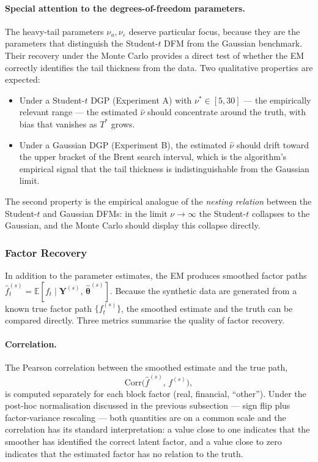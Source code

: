 \documentclass[11pt, a4paper, oneside]{article}
\begin{document}
\paragraph{Special attention to the degrees-of-freedom parameters.}
The heavy-tail parameters $\nu_u, \nu_\varepsilon$ deserve
particular focus, because they are the parameters that distinguish
the Student-$t$ DFM from the Gaussian benchmark. Their recovery
under the Monte Carlo provides a direct test of whether the EM
correctly identifies the tail thickness from the data. Two
qualitative properties are expected:
\begin{itemize}[leftmargin=1.5em, itemsep=3pt]
    \item Under a Student-$t$ DGP (Experiment A) with
          $\nu^* \in [5, 30]$ — the empirically relevant range —
          the estimated $\hat{\nu}$ should concentrate around the
          truth, with bias that vanishes as $T^*$ grows.
    \item Under a Gaussian DGP (Experiment B), the estimated
          $\hat{\nu}$ should drift toward the upper bracket of the
          Brent search interval, which is the algorithm's
          empirical signal that the tail thickness is
          indistinguishable from the Gaussian limit.
\end{itemize}
The second property is the empirical analogue of the \emph{nesting
relation} between the Student-$t$ and Gaussian DFMs: in the limit
$\nu \to \infty$ the Student-$t$ collapses to the Gaussian, and the
Monte Carlo should display this collapse directly.

\subsubsection*{Factor Recovery}

In addition to the parameter estimates, the EM produces smoothed
factor paths
$\hat{f}_t^{(s)} = \mathbb{E}[f_t \mid \mathbf{Y}^{(s)},\, \hat{\boldsymbol{\theta}}^{(s)}]$.
Because the synthetic data are generated from a known true factor
path $\{f_t^{(s)}\}$, the smoothed estimate and the truth can be
compared directly. Three metrics summarise the quality of factor
recovery.

\paragraph{Correlation.}
The Pearson correlation between the smoothed estimate and the true
path,
\[
\mathrm{Corr}\!\big(\hat{f}^{(s)},\, f^{(s)}\big),
\]
is computed separately for each block factor (real, financial,
``other''). Under the post-hoc normalisation discussed in the
previous subsection — sign flip plus factor-variance rescaling —
both quantities are on a common scale and the correlation has its
standard interpretation: a value close to one indicates that the
smoother has identified the correct latent factor, and a value
close to zero indicates that the estimated factor has no relation
to the truth.
\end{document}
